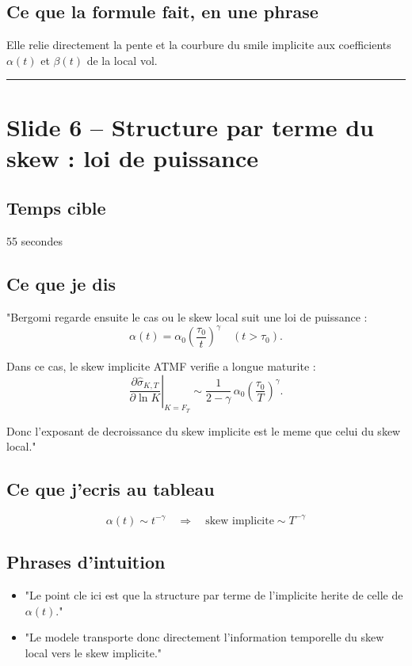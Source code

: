 \documentclass[11pt,a4paper]{article}
\begin{document}
\subsection{Ce que la formule fait, en une phrase}

Elle relie directement la pente et la courbure du smile implicite aux coefficients \(\alpha(t)\) et \(\beta(t)\) de la local vol.

\bigskip\hrule\bigskip

\section{Slide 6 -- Structure par terme du skew : loi de puissance}

\subsection{Temps cible}
55 secondes

\subsection{Ce que je dis}

"Bergomi regarde ensuite le cas ou le skew local suit une loi de puissance :
\[
\alpha(t)=\alpha_0\left(\frac{\tau_0}{t}\right)^\gamma
\quad (t>\tau_0).
\]

Dans ce cas, le skew implicite ATMF verifie a longue maturite :
\[
\left.\frac{\partial \hat{\sigma}_{K,T}}{\partial \ln K}\right|_{K=F_T}
\sim
\frac{1}{2-\gamma}\,
\alpha_0\left(\frac{\tau_0}{T}\right)^\gamma.
\]

Donc l'exposant de decroissance du skew implicite est le meme que celui du skew local."

\subsection{Ce que j'ecris au tableau}

\[
\alpha(t)\sim t^{-\gamma}
\quad\Longrightarrow\quad
\text{skew implicite}\sim T^{-\gamma}
\]

\subsection{Phrases d'intuition}

\begin{itemize}
\item "Le point cle ici est que la structure par terme de l'implicite herite de celle de \(\alpha(t)\)."
\item "Le modele transporte donc directement l'information temporelle du skew local vers le skew implicite."
\end{itemize}
\end{document}
